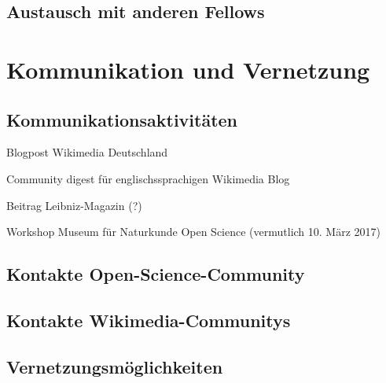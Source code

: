 \documentclass[11pt,a4paper]{article}
\begin{document}
\subsection{Austausch mit anderen Fellows}%



\section{Kommunikation und Vernetzung}%
\subsection{Kommunikationsaktivitäten}%

\begin{compactitem}
\item Blogpost Wikimedia Deutschland
\item Community digest für englischssprachigen Wikimedia Blog
\item Beitrag Leibniz-Magazin (?)
\item Workshop Museum für Naturkunde Open Science (vermutlich 10. März 2017)
\end{compactitem}


\subsection{Kontakte Open-Science-Community}%


\subsection{Kontakte Wikimedia-Communitys}%

\subsection{Vernetzungsmöglichkeiten} %
\end{document}
